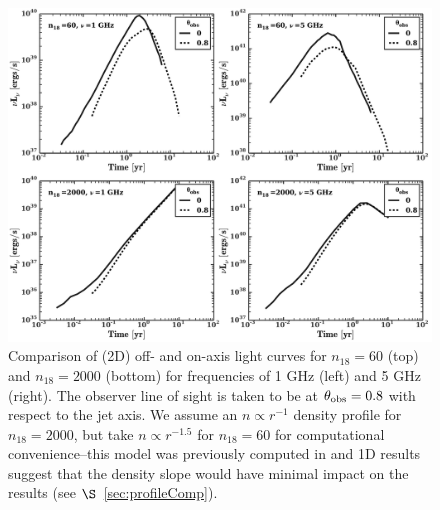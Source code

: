 \documentclass[usenatbib,fleqn]{mnras}
\begin{document}
\begin{figure}
\includegraphics[width=16cm]{on_off.pdf}
\caption{\label{fig:onOff} Comparison of (2D) off- and on-axis light
  curves for $n_{18}=60$ (top) and $n_{18}=2000$ (bottom) for
  frequencies of 1 GHz (left) and 5 GHz (right). The observer line of
  sight is taken to be at $\theta_{\rm obs}=0.8$ with respect to the
  jet axis. We assume an $n\propto r^{-1}$ density profile for
  $n_{18}=2000$, but take $n\propto r^{-1.5}$ for $n_{18}=60$ for
  computational convenience--this model was previously computed in
  \citet{Mimica+2015} and 1D results suggest that the density slope
  would have minimal impact on the results (see
  $\S$~\ref{sec:profileComp}).}
\end{figure}


\end{document}
